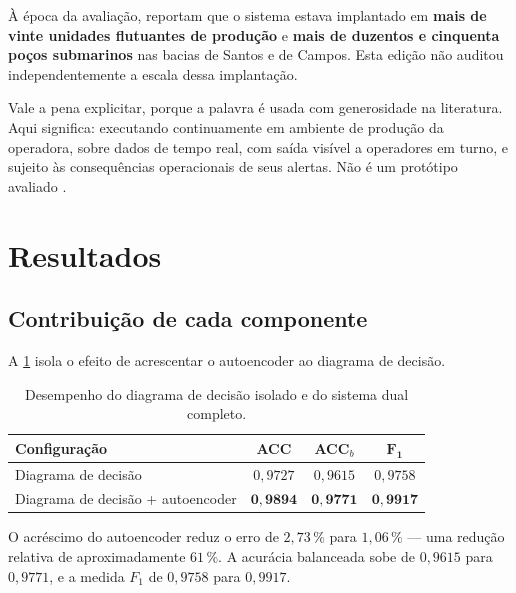À época da avaliação, \citet{aranha2023system} reportam que o sistema estava implantado
em \textbf{mais de vinte unidades flutuantes de produção} e \textbf{mais de duzentos e
cinquenta poços submarinos} nas bacias de Santos e de Campos. Esta edição não auditou
independentemente a escala dessa implantação.

\begin{destaque}
Vale a pena explicitar, porque a palavra é usada com generosidade na literatura. Aqui
significa: executando continuamente em ambiente de produção da operadora, sobre dados
de tempo real, com saída visível a operadores em turno, e sujeito às consequências
operacionais de seus alertas. Não é um protótipo avaliado .
\end{destaque}

\section{Resultados}
\label{sec:dual-resultados}

\subsection{Contribuição de cada componente}

A \cref{tab:dual-componentes} isola o efeito de acrescentar o autoencoder ao diagrama de
decisão.

\begin{table}[htbp]
\centering
\caption{Desempenho do diagrama de decisão isolado e do sistema dual completo.}
\label{tab:dual-componentes}
\begin{tabular}{lccc}
\toprule
\textbf{Configuração} & \textbf{ACC} & \textbf{ACC}$_b$ & $\bm{F_1}$ \\
\midrule
Diagrama de decisão                 & $0{,}9727$ & $0{,}9615$ & $0{,}9758$ \\
Diagrama de decisão + autoencoder   & $\bm{0{,}9894}$ & $\bm{0{,}9771}$ & $\bm{0{,}9917}$ \\
\bottomrule
\end{tabular}
\end{table}

\begin{resultadochave}
O acréscimo do autoencoder reduz o erro de $2{,}73\,\%$ para $1{,}06\,\%$ --- uma
redução relativa de aproximadamente $61\,\%$. A acurácia balanceada sobe de $0{,}9615$
para $0{,}9771$, e a medida $F_1$ de $0{,}9758$ para $0{,}9917$.
\end{resultadochave}

